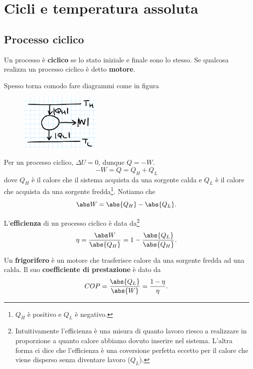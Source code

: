 \section{Cicli e temperatura assoluta}
\subsection{Processo ciclico}
\begin{definition}
Un processo \`e \textbf{ciclico} se lo stato iniziale e finale sono lo stesso. Se qualcosa realizza un processo ciclico \`e detto \textbf{motore}.
\end{definition}

\begin{remark}
Spesso torna comodo fare diagrammi come in figura
\begin{figure}[!htb]
    \centering
    \includegraphics[width=4cm]{images/Diagramma_Ciclo.png}
\end{figure}

\end{remark}

\begin{remark}
Per un processo ciclico, $\Delta U=0$, dunque $Q=-W$.
\[-W=Q=Q_H+Q_L\]
dove $Q_H$ \`e il calore che il sistema acquista da una sorgente calda e $Q_L$ \`e il calore che acquista da una sorgente fredda\footnote{$Q_H$ \`e positivo e $Q_L$ \`e negativo.}. Notiamo che
\[\abs W=\abs{Q_H}-\abs{Q_L}.\]
\end{remark}

\begin{definition}[Efficienza]
L'\textbf{efficienza} di un processo ciclico \`e data da\footnote{Intuitivamente l'efficienza \`e una misura di quanto lavoro riesco a realizzare in proporzione a quanto calore abbiamo dovuto inserire nel sistema. L'altra forma ci dice che l'efficienza \`e una coversione perfetta eccetto per il calore che viene disperso senza diventare lavoro ($Q_L$).}
\[\eta=\frac{\abs W}{\abs{Q_H}}=1-\frac{\abs{Q_L}}{\abs{Q_H}}.\]
\end{definition}

\begin{definition}
Un \textbf{frigorifero} \`e un motore che trasferisce calore da una sorgente fredda ad una calda. Il suo \textbf{coefficiente di prestazione} \`e dato da
\[COP=\frac{\abs{Q_L}}{\abs{W}}=\frac{1-\eta}\eta.\]
\end{definition}

